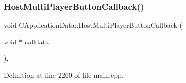 \hypertarget{classCApplicationData_a9f804f7f34e1f0abf8c395cd0032d811}{}\label{classCApplicationData_a9f804f7f34e1f0abf8c395cd0032d811} 
\subsubsection{\texorpdfstring{Host\+Multi\+Player\+Button\+Callback()}{HostMultiPlayerButtonCallback()}}
{\footnotesize\ttfamily void C\+Application\+Data\+::\+Host\+Multi\+Player\+Button\+Callback (\begin{DoxyParamCaption}\item[{void $\ast$}]{calldata }\end{DoxyParamCaption})\hspace{0.3cm}{\ttfamily [static]}, {\ttfamily [protected]}}



Definition at line 2260 of file main.\+cpp.


